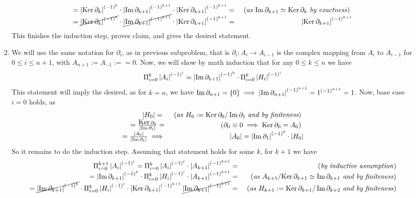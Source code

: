 \documentclass[8pt,fleqn]{article} %
\newcommand{\myexplain}[1]{\mbox{ (\textit{#1})}}
\newcommand{\Ker}{\mbox{\normalfont Ker\,}}
\begin{document}
\begin{enumerate}[label=\bfseries Problem \arabic*.]
\begin{enumerate}[label=(\arabic*).]
\[\begin{array}{rr}
			={\myabs{\Ker\partial_k}^{(-1)^k}}\cdot{\myabs{\Im\partial_{k+1}}^{(-1)^{k+1}}}
				\cdot\myabs{\Ker\partial_{{k+1}}}^{(-1)^{k+1}}=
			&\mbox{ (\textit{as ${\Im\partial_{k+1}}\simeq{\Ker\partial_k}$ by exactness}) }\\
			=\cancel{\myabs{\Ker\partial_k}^{(-1)^k}}\cdot\cancel{\myabs{\Im\partial_{k+1}}^{(-1)^{k+1}}}
				\cdot\myabs{\Ker\partial_{{k+1}}}^{(-1)^{k+1}}=
			&\myabs{\Ker\partial_{{k+1}}}^{(-1)^{k+1}}
		\end{array}\]
		This finishes the induction step, proves claim, and gives the desired statement.
			\item We will use the same notation for $\partial_i$, as in previous subproblem, that is $\partial_i:A_i\to
				A_{i-1}$ is the complex mapping from $A_i$ to $A_{i-1}$ for $0\leq i\leq n+1$, with $A_{n+1}:=A_{-1}:=
				=0$. Now, we will show by math induction that for any $0\leq k\leq n$ we have
				\[\Pi_{i=0}^k\left|A_i\right|^{(-1)^i}=\left|\operatorname{Im}\partial_{k+1}\right|^{(-1)^{k}}\cdot
				\Pi_{i=0}^k\left|H_i\right|^{(-1)^i}\]
				This statement will imply the desired, as for $k=n$, we have $\operatorname{Im}\partial_{n+1}=\left\{0\right\}\implies
				\left|\operatorname{Im}\partial_{n+1}\right|^{(-1)^{n+1}}=1^{(-1)^{n+1}}=1$. Now, base case $i=0$ holds, as
		\[\begin{array}{rr}
			\myabs{H_0}=\
			&\mbox{ (\textit{as} $H_0:=\Ker\partial_0/\Im\partial_{1}$ {\it and by finiteness}) }\\
			=\frac{\Ker\partial_0}{\myabs{\Im\partial_1}}=
			&\mbox{ ({$\partial_0\equiv0\implies\Ker\partial_0=A_0$}) }\\
			=\frac{\myabs{A_0}}{\myabs{\Im\partial_1}}\implies&\myabs{A_0}=\myabs{\Im\partial_1}^{(-1)^0}\cdot\myabs{H_0}
		\end{array}\]
		So it remains to do the induction step. Assuming that statement holds for some $k$, for $k+1$ we have
		\noindent\[\begin{array}{rr}
		\Pi_{i=0}^{k+1}\myabs{A_i}^{(-1)^i}=\Pi_{i=0}^k\myabs{A_i}^{(-1)^i}\cdot\myabs{A_{k+1}}^{(-1)^{k+1}}=
		&\myexplain{by inductive assumption}\\
		=\myabs{\Im\partial_{k+1}}^{(-1)^{k}}\cdot\Pi_{i=0}^k\myabs{H_i}^{(-1)^i}\cdot\myabs{A_{k+1}}^{(-1)^{k+1}}=
		&\myexplain{as $A_{k+1}/\Ker\partial_{k+1}\simeq\Im\partial_{k+1}$ and by finiteness}\\
		=\cancel{\myabs{\Im\partial_{k+1}}^{(-1)^{k}}}
		\cdot\Pi_{i=0}^k\myabs{H_i}^{(-1)^i}\cdot\myabs{\Ker\partial_{k+1}}^{(-1)^{k+1}}
		\cancel{\myabs{\Im\partial_{k+1}}^{(-1)^{k+1}}}=
		&\myexplain{{as} $H_{k+1}:=\Ker\partial_{k+1}/\Im\partial_{k+2}$ {and by finiteness}}\\

\end{array}\]
\end{enumerate}
\end{enumerate}
\end{document}
